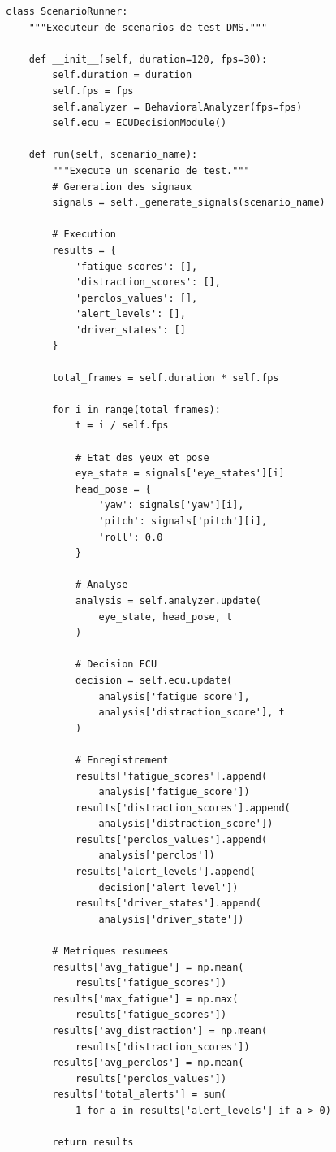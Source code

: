 \begin{lstlisting}[style=pythonstyle, caption={Extrait du module de scénarios de test.}, label={lst:scenarios}]
class ScenarioRunner:
    """Executeur de scenarios de test DMS."""
    
    def __init__(self, duration=120, fps=30):
        self.duration = duration
        self.fps = fps
        self.analyzer = BehavioralAnalyzer(fps=fps)
        self.ecu = ECUDecisionModule()
    
    def run(self, scenario_name):
        """Execute un scenario de test."""
        # Generation des signaux
        signals = self._generate_signals(scenario_name)
        
        # Execution
        results = {
            'fatigue_scores': [],
            'distraction_scores': [],
            'perclos_values': [],
            'alert_levels': [],
            'driver_states': []
        }
        
        total_frames = self.duration * self.fps
        
        for i in range(total_frames):
            t = i / self.fps
            
            # Etat des yeux et pose
            eye_state = signals['eye_states'][i]
            head_pose = {
                'yaw': signals['yaw'][i],
                'pitch': signals['pitch'][i],
                'roll': 0.0
            }
            
            # Analyse
            analysis = self.analyzer.update(
                eye_state, head_pose, t
            )
            
            # Decision ECU
            decision = self.ecu.update(
                analysis['fatigue_score'],
                analysis['distraction_score'], t
            )
            
            # Enregistrement
            results['fatigue_scores'].append(
                analysis['fatigue_score'])
            results['distraction_scores'].append(
                analysis['distraction_score'])
            results['perclos_values'].append(
                analysis['perclos'])
            results['alert_levels'].append(
                decision['alert_level'])
            results['driver_states'].append(
                analysis['driver_state'])
        
        # Metriques resumees
        results['avg_fatigue'] = np.mean(
            results['fatigue_scores'])
        results['max_fatigue'] = np.max(
            results['fatigue_scores'])
        results['avg_distraction'] = np.mean(
            results['distraction_scores'])
        results['avg_perclos'] = np.mean(
            results['perclos_values'])
        results['total_alerts'] = sum(
            1 for a in results['alert_levels'] if a > 0)
        
        return results
\end{lstlisting}


